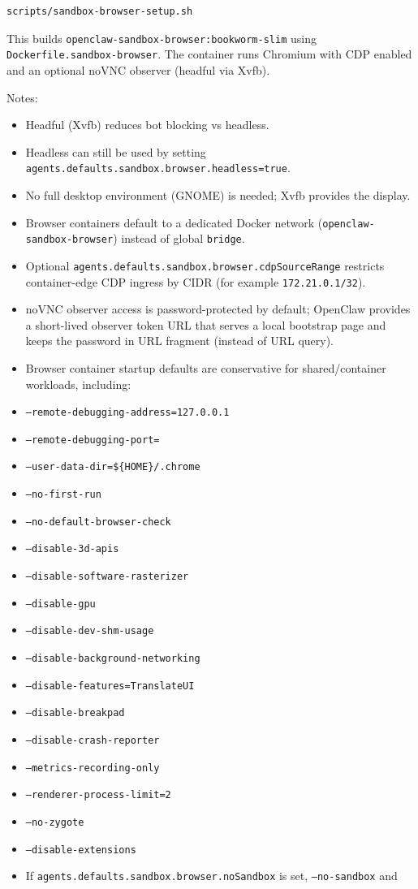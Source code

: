 \begin{lstlisting}[language=bash]
scripts/sandbox-browser-setup.sh
\end{lstlisting}


This builds \texttt{openclaw-sandbox-browser:bookworm-slim} using
\texttt{Dockerfile.sandbox-browser}. The container runs Chromium with CDP enabled and
an optional noVNC observer (headful via Xvfb).

Notes:

\begin{itemize}
  \item Headful (Xvfb) reduces bot blocking vs headless.
  \item Headless can still be used by setting \texttt{agents.defaults.sandbox.browser.headless=true}.
  \item No full desktop environment (GNOME) is needed; Xvfb provides the display.
  \item Browser containers default to a dedicated Docker network (\texttt{openclaw-sandbox-browser}) instead of global \texttt{bridge}.
  \item Optional \texttt{agents.defaults.sandbox.browser.cdpSourceRange} restricts container-edge CDP ingress by CIDR (for example \texttt{172.21.0.1/32}).
  \item noVNC observer access is password-protected by default; OpenClaw provides a short-lived observer token URL that serves a local bootstrap page and keeps the password in URL fragment (instead of URL query).
  \item Browser container startup defaults are conservative for shared/container workloads, including:
  \item \texttt{--remote-debugging-address=127.0.0.1}
  \item \texttt{--remote-debugging-port=}
  \item \texttt{--user-data-dir=\$\{HOME\}/.chrome}
  \item \texttt{--no-first-run}
  \item \texttt{--no-default-browser-check}
  \item \texttt{--disable-3d-apis}
  \item \texttt{--disable-software-rasterizer}
  \item \texttt{--disable-gpu}
  \item \texttt{--disable-dev-shm-usage}
  \item \texttt{--disable-background-networking}
  \item \texttt{--disable-features=TranslateUI}
  \item \texttt{--disable-breakpad}
  \item \texttt{--disable-crash-reporter}
  \item \texttt{--metrics-recording-only}
  \item \texttt{--renderer-process-limit=2}
  \item \texttt{--no-zygote}
  \item \texttt{--disable-extensions}
  \item If \texttt{agents.defaults.sandbox.browser.noSandbox} is set, \texttt{--no-sandbox} and
\end{itemize}

